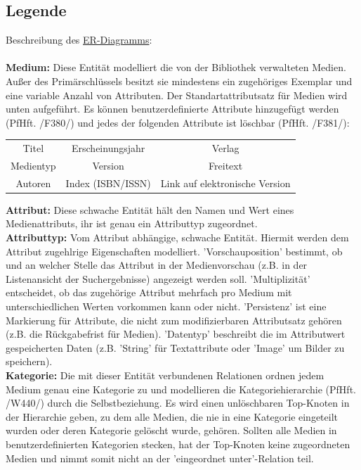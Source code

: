 \documentclass{article}
\begin{document}
\subsection{Legende}
Beschreibung des \hyperlink{ERDia}{ER-Diagramms}: \\
\\
\textbf{Medium:} Diese Entität modelliert die von der Bibliothek verwalteten Medien. Außer des Primärschlüssels besitzt sie mindestens ein zugehöriges Exemplar und eine variable Anzahl von Attributen. Der \hypertarget{Standartattributsatz}{Standartattributsatz} für Medien wird unten aufgeführt. Es können benutzerdefinierte Attribute hinzugefügt werden (PfHft. /F380/) und jedes der folgenden Attribute ist löschbar (PfHft. /F381/):
\begin{center}
\begin{tabular} { c c c }
Titel & Erscheinungsjahr &  Verlag \\
 Medientyp & Version &  Freitext \\
 Autoren &  Index (ISBN/ISSN) &  Link auf elektronische Version \\
\end{tabular}
\end{center}
\textbf{Attribut:} Diese schwache Entität hält den Namen und Wert eines Medienattributs, ihr ist genau ein Attributtyp zugeordnet.\\
\textbf{Attributtyp:} Vom Attribut abhängige, schwache Entität. Hiermit werden dem Attribut zugehlrige Eigenschaften modelliert. 'Vorschauposition' bestimmt, ob und an welcher Stelle das Attribut in der Medienvorschau (z.B. in der Listenansicht der Suchergebnisse) angezeigt werden soll. 'Multiplizität' entscheidet, ob das zugehörige Attribut mehrfach pro Medium mit unterschiedlichen Werten vorkommen kann oder nicht. 'Persistenz' ist eine Markierung für Attribute, die nicht zum modifizierbaren Attributsatz gehören (z.B. die Rückgabefrist für Medien). 'Datentyp' beschreibt die im Attributwert gespeicherten Daten (z.B. 'String' für Textattribute oder 'Image' um Bilder zu speichern). \\
\textbf{Kategorie:} Die mit dieser Entität verbundenen Relationen ordnen jedem Medium genau eine Kategorie zu und modellieren die Kategoriehierarchie (PfHft. /W440/) durch die Selbstbeziehung. Es wird einen unlöschbaren Top-Knoten in der Hierarchie geben, zu dem alle Medien, die nie in eine Kategorie eingeteilt wurden oder deren Kategorie gelöscht wurde, gehören. Sollten alle Medien in benutzerdefinierten Kategorien stecken, hat der Top-Knoten keine zugeordneten Medien und nimmt somit nicht an der 'eingeordnet unter'-Relation teil.\\
\end{document}
